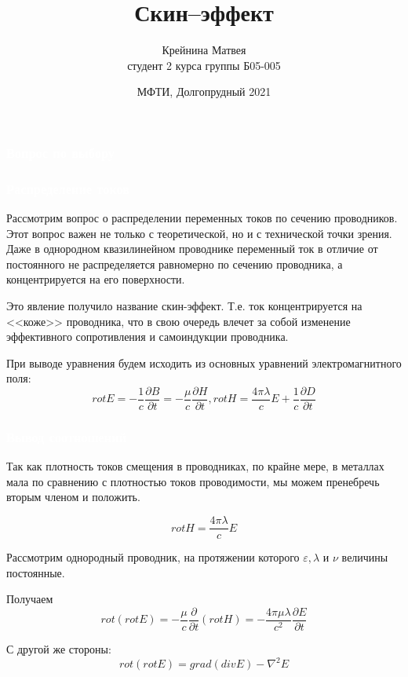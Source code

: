 \documentclass[aspectratio=169]{beamer}
\title{Скин--эффект}
\date{\small{МФТИ, Долгопрудный 2021}}
\author{\small{Крейнина Матвея \\ студент 2 курса группы Б05-005}}
\begin{document}
\begin{frame}
  \frametitle{\textcolor{white}{Вопрос по выбору}} 
	\titlepage
\end{frame}
\begin{frame}
\frametitle{\textcolor{white}{Распределение токов}} 
Рассмотрим вопрос о распределении переменных токов по сечению проводников.
Этот вопрос важен не только с теоретической, но и с технической точки зрения. Даже в однородном квазилинейном проводнике переменный ток в отличие от постоянного не распределяется равномерно по сечению проводника, а концентрируется на его поверхности.

Это явление получило название скин-эффект. Т.е. ток концентрируется на <<коже>> проводника, что в свою очередь влечет за собой изменение эффективного сопротивления и самоиндукции проводника.


При выводе уравнения будем исходить из основных уравнений электромагнитного поля:
\begin{equation*}
rot E = - \frac{1}{c} \frac{\partial B}{\partial t} = - \frac{\mu}{c} \frac{\partial H}{\partial t}, rot H = \frac{4 \pi \lambda}{c}E + \frac{1}{c}\frac{\partial D}{\partial t}
\end{equation*}
\end{frame}

\begin{frame}
\frametitle{\textcolor{white}{Вывод соотношений}}
Так как плотность токов смещения в проводниках, по крайне мере, в металлах мала по сравнению с плотностью токов проводимости, мы можем пренебречь вторым членом и положить. 

\begin{equation*}
	rotH = \frac{4 \pi \lambda}{c} E
\end{equation*}

Рассмотрим однородный проводник, на протяжении которого $\varepsilon, \lambda$ и $\nu$ величины постоянные. 

Получаем
\begin{equation*}
 rot (rot E) = - \frac{\mu}{c} \frac{\partial}{\partial t}(rot H) = -\frac{4 \pi \mu \lambda}{c^2}  \frac{\partial E}{\partial t}
\end{equation*}

С другой же стороны:
\begin{equation*}
rot(rot E) = grad(divE) - \nabla^2E
\end{equation*}
\end{frame}
\end{document}
